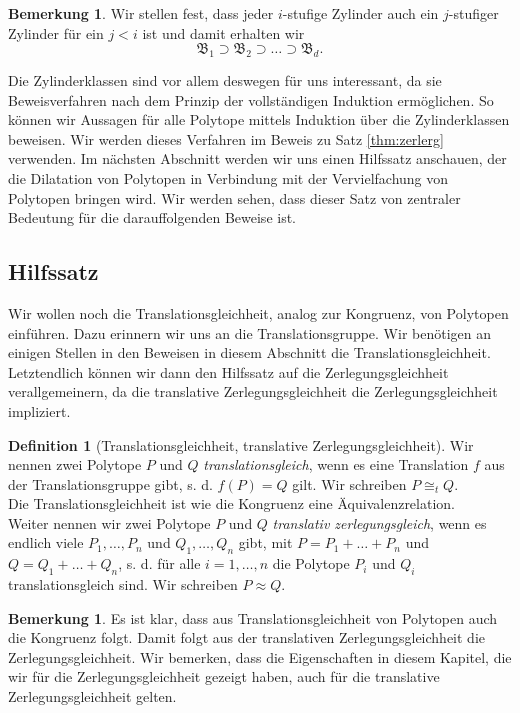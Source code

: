 \documentclass[11pt,titlepage]{article}
\theoremstyle{definition}
\newtheorem{definition}[theorem]{Definition}
\newtheorem{remark}[theorem]{Bemerkung}
\theoremstyle{remark}
\begin{document}
	\begin{remark}
		Wir stellen fest, dass jeder $i$-stufige Zylinder auch ein $j$-stufiger 
		Zylinder für ein $j<i$ ist und damit erhalten wir
		\[\mathfrak{B}_1\supset \mathfrak{B}_2\supset \ldots\supset\mathfrak{B}_d.\]
	\end{remark}
	
	Die Zylinderklassen sind vor allem deswegen für uns interessant, da sie 
	Beweisverfahren nach dem Prinzip der vollständigen Induktion ermöglichen. 
	So können wir Aussagen für alle Polytope mittels Induktion über die 
	Zylinderklassen beweisen. Wir werden dieses Verfahren im Beweis zu Satz 
	\ref{thm:zerlerg} verwenden. Im nächsten Abschnitt werden wir uns 
	einen Hilfssatz anschauen, der die Dilatation von Polytopen 
	in Verbindung mit der Vervielfachung von Polytopen bringen wird. 
	Wir werden sehen, dass dieser Satz von zentraler Bedeutung für 
	die darauffolgenden Beweise ist.
	
	\subsection{Hilfssatz}
	
	Wir wollen noch die Translationsgleichheit, analog zur Kongruenz, 
	von Polytopen einführen. 
	Dazu erinnern wir uns an die Translationsgruppe.  
	Wir benötigen an einigen Stellen in den Beweisen in diesem Abschnitt 
	die Translationsgleichheit. Letztendlich können wir dann den Hilfssatz 
	auf die Zerlegungsgleichheit verallgemeinern, da die translative 
	Zerlegungsgleichheit die Zerlegungsgleichheit impliziert.
	
	\begin{definition}[Translationsgleichheit, translative Zerlegungsgleichheit]
		Wir nennen zwei Polytope $P$ und $Q$ \textsl{translationsgleich}, wenn es 
		eine Translation $f$ aus der Translationsgruppe gibt, s. d. 
		$f(P)=Q$ gilt. Wir schreiben $P\cong_t Q$. \\
		Die Translationsgleichheit ist wie die Kongruenz eine 
		Äquivalenzrelation. \\
		Weiter nennen wir zwei Polytope $P$ und $Q$ \textsl{translativ 
		zerlegungsgleich}, wenn es endlich viele $P_1,\ldots,P_n$ und 
		$Q_1,\ldots,Q_n$ gibt, mit $P=P_1+\ldots+P_n$ und $Q=Q_1+\ldots+Q_n$, s. d. 
		für alle $i=1,\ldots,n$ die Polytope $P_i$ und $Q_i$ translationsgleich 
		sind. Wir schreiben $P\approx Q$.
	\end{definition}
	
	\begin{remark}
		Es ist klar, dass aus Translationsgleichheit von Polytopen auch die 
		Kongruenz folgt. Damit folgt aus der translativen Zerlegungsgleichheit 
		die Zerlegungsgleichheit. Wir bemerken, dass die Eigenschaften 
		in diesem Kapitel, 
		die wir für die Zerlegungsgleichheit gezeigt haben, 
		auch für die translative Zerlegungsgleichheit gelten. 
	\end{remark}
	
\end{document}
